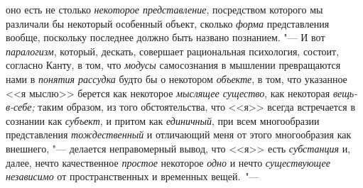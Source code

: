 оно есть не столько {\em некоторое
представление}, посредством которого мы различали бы
некоторый особенный объект, сколько {\em форма} представления
вообще, поскольку последнее должно быть названо познанием. "--- И вот
{\em паралогизм}, который, дескать, совершает рациональная психология,
состоит, согласно Канту, в том, что {\em модусы}
самосознания в мышлении превращаются нами в {\em понятия рассудка}
будто бы о некотором {\em объекте}, в том, что
указанное <<я мыслю>> берется как некоторое {\em мыслящее существо},
как некоторая {\em вещь-в-себе;} таким
образом, из того обстоятельства, что <<я>> всегда встречается в сознании
как {\em субъект}, и притом как {\em единичный}, при всем
многообразии представления {\em тождественный} и
отличающий меня от этого многообразия как внешнего, "---
делается неправомерный вывод, что <<я>> есть {\em субстанция} и,
далее, нечто качественное {\em простое} некоторое {\em одно}
и нечто {\em существующее независимо} от пространственных и временных
вещей.~"---

